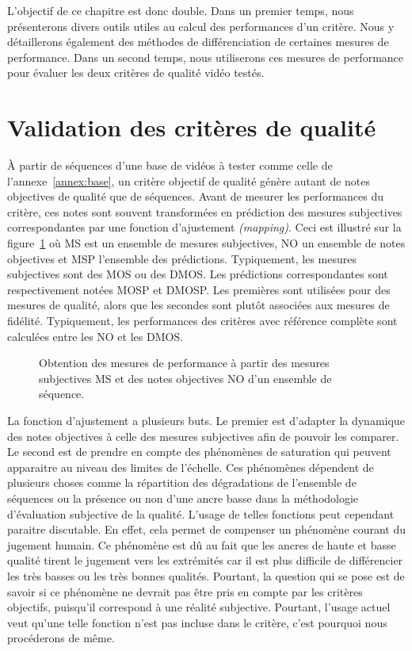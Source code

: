 L'objectif de ce chapitre est donc double. Dans un premier temps, nous présenterons divers outils utiles au calcul des performances d'un critère. Nous y détaillerons également des méthodes de différenciation de certaines mesures de performance. Dans un second temps, nous utiliserons ces mesures de performance pour évaluer les deux critères de qualité vidéo testés.


\section{Validation des critères de qualité}
À partir de séquences d'une base de vidéos à tester comme celle de l'annexe~\ref{annex:base}, un critère objectif de qualité génère autant de notes objectives de qualité que de séquences. Avant de mesurer les performances du critère, ces notes sont souvent transformées en prédiction des mesures subjectives correspondantes par une fonction d'ajustement \emph{(mapping)}. Ceci est illustré sur la figure~\ref{fig:definMOS} où MS est un ensemble de mesures subjectives, NO un ensemble de notes objectives et MSP l'ensemble des prédictions. Typiquement, les mesures subjectives sont des MOS ou des DMOS. Les prédictions correspondantes sont respectivement notées MOSP et DMOSP. Les premières sont utilisées pour des mesures de qualité, alors que les secondes sont plutôt associées aux mesures de fidélité. Typiquement, les performances des critères avec référence complète sont calculées entre les NO et les DMOS.

\begin{figure}[htbp]
\centering

\caption{Obtention des mesures de performance à partir des mesures subjectives MS et des notes objectives NO d'un ensemble de séquence.}
\label{fig:definMOS}
\end{figure}

La fonction d'ajustement a plusieurs buts. Le premier est d'adapter la dynamique des notes objectives à celle des mesures subjectives afin de pouvoir les comparer. Le second est de prendre en compte des phénomènes de saturation qui peuvent apparaitre au niveau des limites de l'échelle. Ces phénomènes dépendent de plusieurs choses comme la répartition des dégradations de l'ensemble de séquences ou la présence ou non d'une ancre basse dans la méthodologie d'évaluation subjective de la qualité. L'usage de telles fonctions peut cependant paraitre discutable. En effet, cela permet de compenser un phénomène courant du jugement humain. Ce phénomène est dû au fait que les ancres de haute et basse qualité tirent le jugement vers les extrémités car il est plus difficile de différencier les très basses ou les très bonnes qualités. Pourtant, la question qui se pose est de savoir si ce phénomène ne devrait pas être pris en compte par les critères objectifs, puisqu'il correspond à une réalité subjective. Pourtant, l'usage actuel veut qu'une telle fonction n'est pas incluse dans le critère, c'est pourquoi nous procéderons de même.


